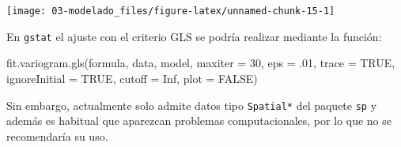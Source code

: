 \documentclass[
  spanish,
]{book}
\newenvironment{Shaded}{\begin{snugshade}}{\end{snugshade}}
\newcommand{\AttributeTok}[1]{\textcolor[rgb]{0.77,0.63,0.00}{#1}}
\newcommand{\ConstantTok}[1]{\textcolor[rgb]{0.00,0.00,0.00}{#1}}
\newcommand{\DecValTok}[1]{\textcolor[rgb]{0.00,0.00,0.81}{#1}}
\newcommand{\FloatTok}[1]{\textcolor[rgb]{0.00,0.00,0.81}{#1}}
\newcommand{\FunctionTok}[1]{\textcolor[rgb]{0.00,0.00,0.00}{#1}}
\newcommand{\NormalTok}[1]{#1}
\newcommand{\SpecialCharTok}[1]{\textcolor[rgb]{0.00,0.00,0.00}{#1}}
\newcommand{\StringTok}[1]{\textcolor[rgb]{0.31,0.60,0.02}{#1}}
\theoremstyle{break}
\theoremstyle{definition}
\theoremstyle{definition}
\theoremstyle{definition}
\theoremstyle{definition}
\theoremstyle{remark}
\begin{document}
\begin{Shaded}
\end{Shaded}

\begin{center}\texttt{[image: 03-modelado\_files/figure-latex/unnamed-chunk-15-1]} \end{center}

En \texttt{gstat} el ajuste con el criterio GLS se podría realizar mediante la función:

\begin{Shaded}
\begin{Highlighting}[]
\FunctionTok{fit.variogram.gls}\NormalTok{(formula, data, model, }\AttributeTok{maxiter =} \DecValTok{30}\NormalTok{, }\AttributeTok{eps =}\NormalTok{ .}\DecValTok{01}\NormalTok{, }
      \AttributeTok{trace =} \ConstantTok{TRUE}\NormalTok{, }\AttributeTok{ignoreInitial =} \ConstantTok{TRUE}\NormalTok{, }\AttributeTok{cutoff =} \ConstantTok{Inf}\NormalTok{, }\AttributeTok{plot =} \ConstantTok{FALSE}\NormalTok{)}
\end{Highlighting}
\end{Shaded}

Sin embargo, actualmente solo admite datos tipo \texttt{Spatial*} del paquete \texttt{sp} y además es habitual que aparezcan problemas computacionales, por lo que no se recomendaría su uso.
\end{document}
